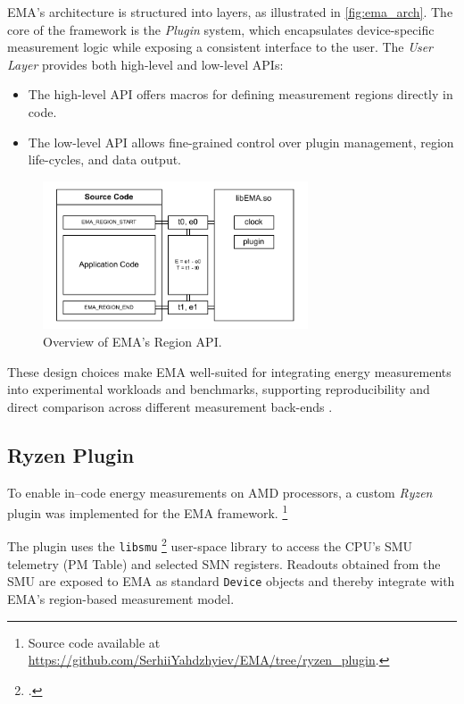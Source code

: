 \gls{EMA}'s architecture is structured into layers, as illustrated in
\cref{fig:ema_arch}. The core of the framework is the \emph{Plugin} system,
which encapsulates device-specific measurement logic while exposing a
consistent interface to the user. The \emph{User Layer} provides both
high-level and low-level \gls{API}s:
\begin{itemize}
    \item The high-level \gls{API} offers macros for defining measurement
        regions directly in code. 
    \item The low-level \gls{API} allows fine-grained control over plugin
        management, region life-cycles, and data output.
\end{itemize}
\parencite{NAAICE}

\begin{figure}[htbp]
    \centering
    \includegraphics[width=0.7\textwidth]{assets/ema_region}
    \caption{Overview of \gls{EMA}'s Region API.}
    \label{fig:ema_region}
\end{figure}

These design choices make \gls{EMA} well-suited for integrating energy
measurements into experimental workloads and benchmarks, supporting
reproducibility and direct comparison across different measurement back-ends
\parencite{NAAICE}.

\subsection{Ryzen Plugin}

To enable in--code energy measurements on AMD processors, a custom
\textit{Ryzen} plugin was implemented for the \gls{EMA} framework.
\footnote{Source code available at
\url{https://github.com/SerhiiYahdzhyiev/EMA/tree/ryzen_plugin}.}

The plugin uses the \texttt{libsmu} \footcite{RyzenSMU_GitHub} user-space
library to access the \gls{CPU}'s \gls{SMU} telemetry (\gls{PM} Table) and
selected \gls{SMN} registers. Readouts obtained
from the \gls{SMU} are exposed to \gls{EMA} as standard \texttt{Device} objects and
thereby integrate with \gls{EMA}'s region-based measurement model.

